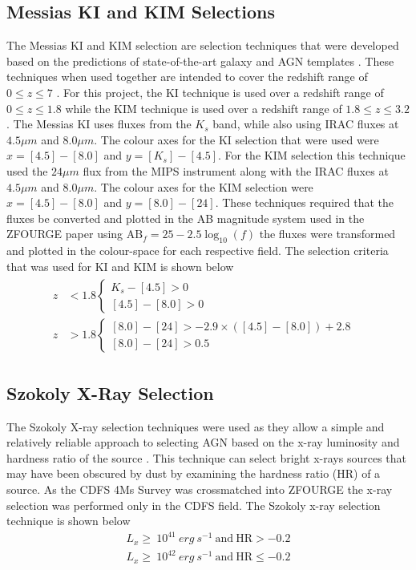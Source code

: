 \documentclass[12pt]{iopart}
\begin{document}
\subsection{Messias KI and KIM Selections}
The Messias KI and KIM selection are selection techniques that were developed based on the predictions of state-of-the-art galaxy and AGN templates \cite{messias_new_2012}. These techniques when used together are intended to cover the redshift range of $0 \leq z \leq 7$ \cite{messias_new_2012}. For this project, the KI technique is used over a redshift range of $0 \leq z \leq 1.8$ while the KIM technique is used over a redshift range of $1.8 \leq z \leq 3.2$. The Messias KI uses fluxes from the $K_s$ band, while also using IRAC fluxes at $4.5\mu m$ and $8.0\mu m$. The colour axes for the KI selection that were used were $x = [4.5] - [8.0]$ and $y = [K_s] - [4.5]$. For the KIM selection this technique used the $24\mu m$ flux from the MIPS instrument along with the IRAC fluxes at $4.5\mu m$ and $8.0\mu m$. The colour axes for the KIM selection were $x = [4.5] - [8.0]$ and $y = [8.0] - [24]$. These techniques required that the fluxes be converted and plotted in the AB magnitude system used in the ZFOURGE paper \cite{straatman_fourstar_2016} using $\text{AB}_f =25-2.5\log_{10} \left( f \right)$ the fluxes were transformed and plotted in the colour-space for each respective field. The selection criteria that was used for KI and KIM is shown below
\begin{align*}
    \begin{split}
        z&<1.8\begin{cases}K_{s}-[4.5]>0&\\ [4.5]-[8.0]>0&\end{cases} \\
        z&>1.8\begin{cases}[8.0]-[24]>-2.9\times ([4.5]-[8.0])+2.8&\\ [8.0]-[24]>0.5&\end{cases}
    \end{split}
\end{align*}
\subsection{Szokoly X-Ray Selection}
The Szokoly X-ray selection techniques were used as they allow a simple and relatively reliable approach to selecting AGN based on the x-ray luminosity and hardness ratio of the source \cite{szokoly_chandra_2004}. This technique can select bright x-rays sources that may have been obscured by dust by examining the hardness ratio (HR) of a source. As the CDFS 4Ms Survey was crossmatched into ZFOURGE the x-ray selection was performed only in the CDFS field. The Szokoly x-ray selection technique is shown below
\begin{align*}
    L_x \geq \ 10^{41}\ erg\ s^{-1}\ \text{and}\ \text{HR} > -0.2 \\
    L_x \geq \ 10^{42}\ erg\ s^{-1}\ \text{and}\  \text{HR} \leq -0.2
\end{align*}
\end{document}
